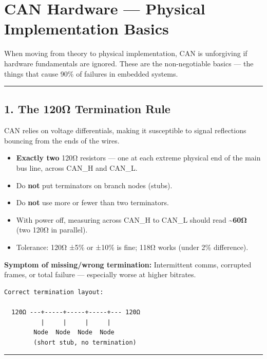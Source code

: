 \documentclass[12pt,a4paper,oneside]{report}
\providecommand{\tightlist}{\setlength{\itemsep}{0pt}\setlength{\parskip}{0pt}}
\begin{document}
\chapter{CAN Hardware --- Physical Implementation
Basics}\label{can-hardware-physical-implementation-basics}

When moving from theory to physical implementation, CAN is unforgiving if
hardware fundamentals are ignored. These are the non-negotiable basics --- the
things that cause 90\% of failures in embedded systems.

\begin{center}\rule{0.5\linewidth}{0.5pt}\end{center}

\section{1. The 120Ω Termination Rule}\label{the-120ux3c9-termination-rule}

CAN relies on voltage differentials, making it susceptible to signal reflections
bouncing from the ends of the wires.

\begin{itemize}
\tightlist
\item
  \textbf{Exactly two} 120Ω resistors --- one at each extreme physical end of
  the main bus line, across CAN\_H and CAN\_L.
\item
  Do \textbf{not} put terminators on branch nodes (stubs).
\item
  Do \textbf{not} use more or fewer than two terminators.
\item
  With power off, measuring across CAN\_H to CAN\_L should read
  \textbf{\textasciitilde60Ω} (two 120Ω in parallel).
\item
  Tolerance: 120Ω ±5\% or ±10\% is fine; 118Ω works (under 2\% difference).
\end{itemize}

\textbf{Symptom of missing/wrong termination:} Intermittent comms, corrupted
frames, or total failure --- especially worse at higher bitrates.

\begin{verbatim}
Correct termination layout:

  120Ω ---+-----+-----+-----+--- 120Ω
          |     |     |     |
        Node  Node  Node  Node
        (short stub, no termination)
\end{verbatim}

\begin{center}\rule{0.5\linewidth}{0.5pt}\end{center}
\end{document}
